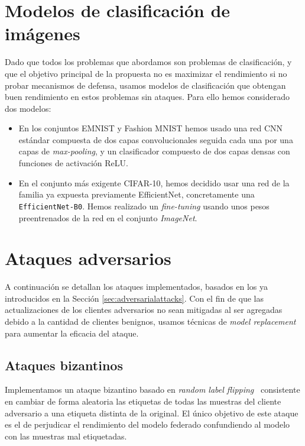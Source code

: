 \section{Modelos de clasificación de imágenes}\label{sec:modelos}

Dado que todos los problemas que abordamos son problemas de clasificación, y que el objetivo principal de la propuesta no es maximizar el rendimiento si no probar mecanismos de defensa, usamos modelos de clasificación que obtengan buen rendimiento en estos problemas sin ataques. Para ello hemos considerado dos modelos:

\begin{itemize}
    \item En los conjuntos EMNIST y Fashion MNIST hemos usado una red \ac{CNN} estándar compuesta de dos capas convolucionales seguida cada una por una capas de \textit{max-pooling}, y un clasificador compuesto de dos capas densas con funciones de activación ReLU.
    \item En el conjunto más exigente CIFAR-10, hemos decidido usar una red de la familia ya expuesta previamente EfficientNet, concretamente una \texttt{EfficientNet-B0}. Hemos realizado un \textit{fine-tuning} usando unos pesos preentrenados de la red en el conjunto \textit{ImageNet}.
\end{itemize}

\section{Ataques adversarios}\label{sec:ataques}

A continuación se detallan los ataques implementados, basados en los ya introducidos en la Sección \ref{sec:adversarialattacks}. Con el fin de que las actualizaciones de los clientes adversarios no sean mitigadas al ser agregadas debido a la cantidad de clientes benignos, usamos técnicas de \textit{model replacement} para aumentar la eficacia del ataque.

\subsection{Ataques bizantinos}
Implementamos un ataque bizantino basado en \textit{random label flipping}~\cite{survey-nuria-2023} consistente en cambiar de forma aleatoria las etiquetas de todas las muestras del cliente adversario a una etiqueta distinta de la original. El único objetivo de este ataque es el de perjudicar el rendimiento del modelo federado confundiendo al modelo con las muestras mal etiquetadas.

